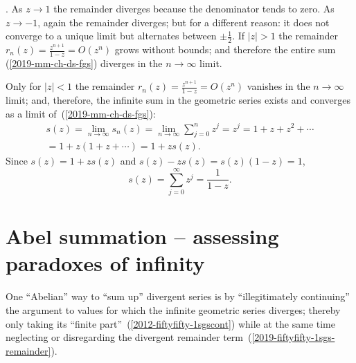 .
As $z \rightarrow 1$  the remainder diverges because the denominator tends to zero.
As $z \rightarrow -1$, again  the remainder diverges; but for a different reason: it does not converge
to a unique limit but alternates between $\pm \frac{1}{2}$.
If $\vert z\vert > 1$  the remainder  $r_n(z) = \frac{z^{n+1}}{1 - z} =O( z^n )$
grows without bounds; and
therefore the entire sum (\ref{2019-mm-ch-ds-fgs}) diverges in the $n\rightarrow \infty$ limit.


Only for $\vert z\vert <1$
the remainder  $r_n(z) = \frac{z^{n+1}}{1 - z} =O( z^n )$
vanishes in the $n\rightarrow \infty$ limit;
and, therefore, the infinite sum in the geometric series exists and
converges as a limit of~(\ref{2019-mm-ch-ds-fgs}):
\begin{equation}
\begin{split}
s(z) =
\lim_{n\rightarrow \infty}
s_n(z)=
\lim_{n\rightarrow \infty}
\sum_{j=0}^n z^j
=  z^j=1+z+z^2+  \cdots     \\
=1+ z(1+z+  \cdots)  =1+z s(z).
\end{split}
\label{2009-fiftyfifty-1sgs}
\end{equation}
Since $s(z)=1+z s(z)$
and
$s(z)-z s(z)=s(z)(1-z)=1$,
\begin{equation}
s(z)= \sum_{j=0}^\infty z^j= \frac{1}{1-z}.
\label{2012-fiftyfifty-1sgscont}
\end{equation}



\section{Abel summation  -- assessing paradoxes of infinity}

One ``Abelian'' way to ``sum up'' divergent series is by ``illegitimately continuing''
the argument
to  values for which the
infinite geometric series diverges;
thereby only taking its ``finite part''~(\ref{2012-fiftyfifty-1sgscont})
while at the same time neglecting or disregarding
the divergent remainder term~(\ref{2019-fiftyfifty-1sgs-remainder}).


